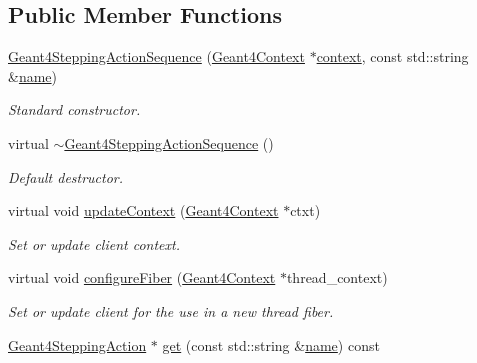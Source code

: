 \subsection*{Public Member Functions}
\begin{DoxyCompactItemize}
\item 
\hyperlink{class_d_d4hep_1_1_simulation_1_1_geant4_stepping_action_sequence_aa4a60d2c258df480a31085e49ebb2832}{Geant4\+Stepping\+Action\+Sequence} (\hyperlink{class_d_d4hep_1_1_simulation_1_1_geant4_context}{Geant4\+Context} $\ast$\hyperlink{class_d_d4hep_1_1_simulation_1_1_geant4_action_aa9d87f0ec2a72b7fc2591b18f98d75cf}{context}, const std\+::string \&\hyperlink{class_d_d4hep_1_1_simulation_1_1_geant4_action_af374e70b014d16afb81dd9d77cc3894b}{name})
\begin{DoxyCompactList}\small\item\em Standard constructor. \end{DoxyCompactList}\item 
virtual \hyperlink{class_d_d4hep_1_1_simulation_1_1_geant4_stepping_action_sequence_a7b7b346f45f9194e6aec6eafdde18448}{$\sim$\+Geant4\+Stepping\+Action\+Sequence} ()
\begin{DoxyCompactList}\small\item\em Default destructor. \end{DoxyCompactList}\item 
virtual void \hyperlink{class_d_d4hep_1_1_simulation_1_1_geant4_stepping_action_sequence_aababd8e6f650101a6ade162f82a29f61}{update\+Context} (\hyperlink{class_d_d4hep_1_1_simulation_1_1_geant4_context}{Geant4\+Context} $\ast$ctxt)
\begin{DoxyCompactList}\small\item\em Set or update client context. \end{DoxyCompactList}\item 
virtual void \hyperlink{class_d_d4hep_1_1_simulation_1_1_geant4_stepping_action_sequence_ad5680d2d225421b9cf2cd6b530d3ab5f}{configure\+Fiber} (\hyperlink{class_d_d4hep_1_1_simulation_1_1_geant4_context}{Geant4\+Context} $\ast$thread\+\_\+context)
\begin{DoxyCompactList}\small\item\em Set or update client for the use in a new thread fiber. \end{DoxyCompactList}\item 
\hyperlink{class_d_d4hep_1_1_simulation_1_1_geant4_stepping_action}{Geant4\+Stepping\+Action} $\ast$ \hyperlink{class_d_d4hep_1_1_simulation_1_1_geant4_stepping_action_sequence_a6f059c3e7a305ce172737a4d4003b043}{get} (const std\+::string \&\hyperlink{class_d_d4hep_1_1_simulation_1_1_geant4_action_af374e70b014d16afb81dd9d77cc3894b}{name}) const

\end{DoxyCompactItemize}
